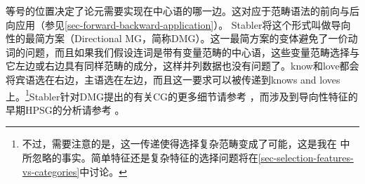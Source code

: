等号的位置决定了论元需要实现在中心语的哪一边。这对应于范畴语法\indexcg 的前向与后向应用（参见\ref{sec-forward-backward-application}）。
Stabler将这个形式叫做导向性的最简方案（Directional MG，简称DMG）。这一最简方案的变体避免了一价动词的问题，而且如果我们假设连词是带有变量范畴的中心语，这些变量范畴选择与它左边或右边具有同样范畴的成分，这样并列数据也没有问题了。know和love都会将宾语选在右边，主语选在左边，而且这一要求可以被传递到knows and loves上。\footnote{%
不过，需要注意的是，这一传递使得选择复杂范畴变成了可能，这是我在 中所忽略的事实。简单特征还是复杂特征的选择问题将在\ref{sec-selection-features-vs-categories}中讨论。}Stabler针对DMG提出的有关CG的更多细节请参考 ，而涉及到导向性特征的早期HPSG\indexhpsg 的分析请参考 \citet[]{BvN98}。
\nocite{Pollard88a}


